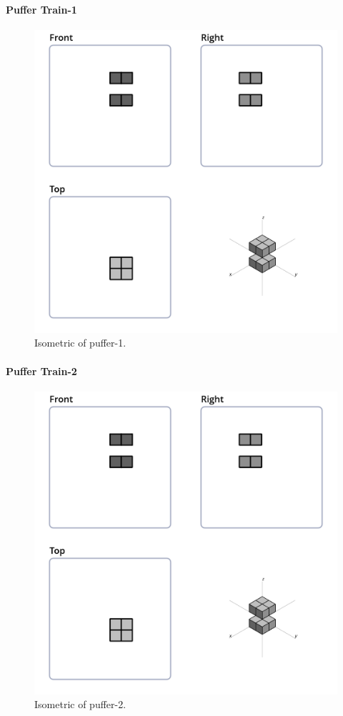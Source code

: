 \paragraph{Puffer Train-1}
\begin{figure}
	\centering
	\includegraphics[scale=0.3]{iso_settings/puffer_1.png}
	\caption{Isometric of puffer-1.}
  \label{fig:iso-puffer-1}
\end{figure}

\paragraph{Puffer Train-2}
\begin{figure}
	\centering
	\includegraphics[scale=0.3]{iso_settings/puffer_1.png}
	\caption{Isometric of puffer-2.}
  \label{fig:iso-puffer-2}
\end{figure}
